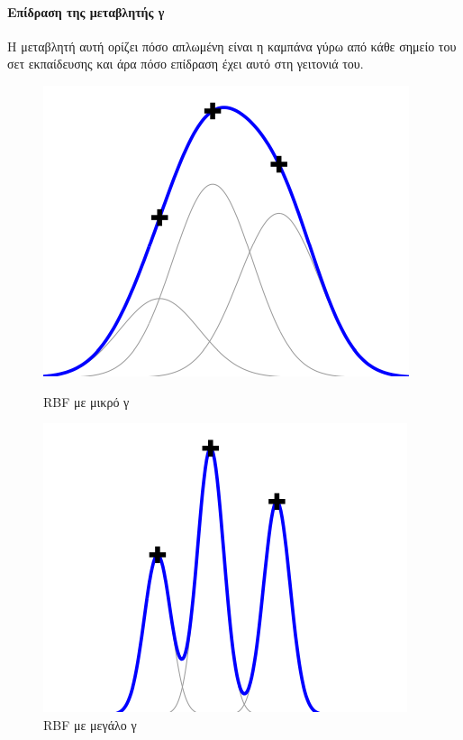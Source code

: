 \documentclass{article}
\begin{document}
\paragraph{Επίδραση της μεταβλητής γ} Η μεταβλητή αυτή ορίζει πόσο απλωμένη είναι η καμπάνα γύρω από κάθε σημείο του σετ εκπαίδευσης και άρα πόσο επίδραση έχει αυτό στη γειτονιά του.
\begin{figure}[H]
    \centering
    \begin{minipage}{.5\textwidth}
        \centering
        \includegraphics[width=0.8\linewidth, height=0.15\textheight]{smallg.png}
        \caption[RBF με μικρό γ]{RBF με μικρό γ}
        
    \end{minipage}%
    \begin{minipage}{0.5\textwidth}
        \centering
        \includegraphics[width=0.8\linewidth, height=0.15\textheight]{big.png}
        \caption[RBF με μεγάλο γ]{RBF με μεγάλο γ}
       
    \end{minipage}
\end{figure}
\end{document}
